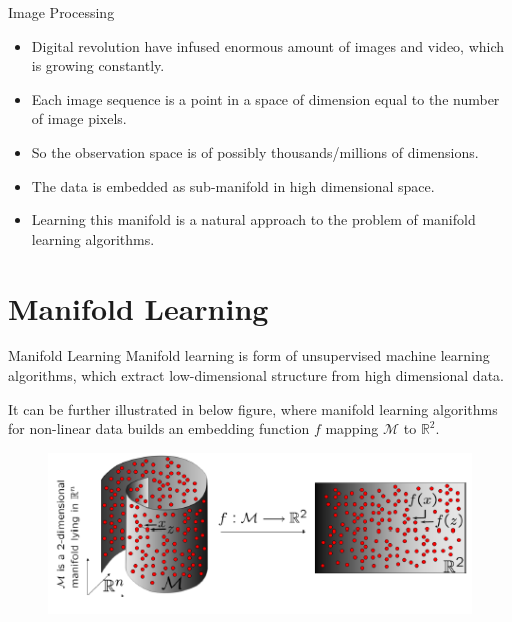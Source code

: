 \documentclass{beamer}
\theoremstyle{plain}
\theoremstyle{definition}
\theoremstyle{plain}
\theoremstyle{plain}
\begin{document}
\begin{frame}{Image Processing}
\begin{itemize}
\item Digital revolution have infused enormous amount of images and video, which is growing constantly.
\item Each image sequence is a point in a space of dimension equal to the number of image pixels.
\item So the observation space is of possibly thousands/millions of dimensions.
\item The data is embedded as sub-manifold in high dimensional space.
\item Learning this manifold is a natural approach to the problem of manifold learning algorithms.
\end{itemize}

\end{frame}
\section{Manifold Learning}
\begin{frame}{Manifold Learning}
Manifold learning is form of unsupervised machine learning algorithms, which  extract low-dimensional structure from high dimensional data. 

It can be further illustrated in below figure, where manifold learning algorithms for non-linear data builds an embedding function $f$ mapping $\mathcal{M}$ to $\mathbb{R}^2$.

\begin{figure}[ht]
\begin{center}
\includegraphics[width=\textwidth]{./Figures/manifold.png}
\end{center}
\end{figure}
\end{frame}
\end{document}
